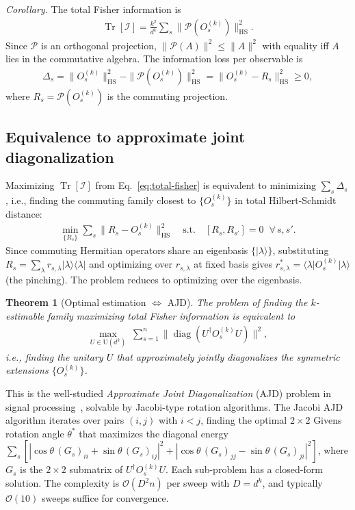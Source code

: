 \documentclass[aps,%
twocolumn,%
floatfix,%
pra,%
amsfonts,%
groupedaddress,%
superscriptaddress]{revtex4-2}%
\newtheorem{theorem}{Theorem}
\DeclareMathOperator{\tr}{Tr}
\DeclareMathOperator{\diag}{diag}
\newcommand{\bra}[1]{\langle #1\rvert}
\newcommand{\ket}[1]{\lvert #1\rangle}
\newcommand{\proj}[1]{\lvert #1\rangle\!\langle #1\rvert}
\newcommand{\1}{\mathbbm{1}}
\newcommand*{\cP}{\mathcal{P}}
\newcommand*{\cI}{\mathcal{I}}
\begin{document}
\emph{Corollary.} The total Fisher information is
\begin{align}\label{eq:total-fisher}
\tr[\cI] = \frac{k^2}{d^k}\sum_s \|\cP(O_s^{(k)})\|_{\mathrm{HS}}^2.
\end{align}
Since $\cP$ is an orthogonal projection, $\|\cP(A)\|^2 \leq \|A\|^2$ with equality iff $A$ lies in the commutative algebra. The information loss per observable is
\begin{align}\label{eq:info-loss}
\Delta_s = \|O_s^{(k)}\|_{\mathrm{HS}}^2 - \|\cP(O_s^{(k)})\|_{\mathrm{HS}}^2 = \|O_s^{(k)} - R_s\|_{\mathrm{HS}}^2 \geq 0,
\end{align}
where $R_s = \cP(O_s^{(k)})$ is the commuting projection.


\subsection{Equivalence to approximate joint diagonalization}\label{app:ajd}

Maximizing $\tr[\cI]$ from Eq.~\eqref{eq:total-fisher} is equivalent to minimizing $\sum_s \Delta_s$, i.e., finding the commuting family closest to $\{O_s^{(k)}\}$ in total Hilbert-Schmidt distance:
\begin{align}\label{eq:min-distance}
\min_{\{R_s\}} \sum_s \|R_s - O_s^{(k)}\|_{\mathrm{HS}}^2 \quad\text{s.t.}\quad [R_s, R_{s'}] = 0\;\;\forall\,s,s'.
\end{align}
Since commuting Hermitian operators share an eigenbasis $\{|\lambda\rangle\}$, substituting $R_s = \sum_\lambda r_{s,\lambda}\proj{\lambda}$ and optimizing over $r_{s,\lambda}$ at fixed basis gives $r_{s,\lambda}^* = \bra{\lambda}O_s^{(k)}\ket{\lambda}$ (the pinching). The problem reduces to optimizing over the eigenbasis.

\begin{theorem}[Optimal estimation $\Leftrightarrow$ AJD]\label{thm:ajd}
The problem of finding the $k$-estimable family maximizing total Fisher information is equivalent to
\begin{align}\label{eq:ajd}
\max_{U \in \mathrm{U}(d^k)} \;\sum_{s=1}^n \|\diag(U^\dagger O_s^{(k)} U)\|^2,
\end{align}
i.e., finding the unitary $U$ that \emph{approximately jointly diagonalizes} the symmetric extensions $\{O_s^{(k)}\}$.
\end{theorem}

This is the well-studied \emph{Approximate Joint Diagonalization} (AJD) problem in signal processing~\cite{cardoso1996joint}, solvable by Jacobi-type rotation algorithms. The Jacobi AJD algorithm iterates over pairs $(i,j)$ with $i < j$, finding the optimal $2\times 2$ Givens rotation angle $\theta^*$ that maximizes the diagonal energy $\sum_s [|\cos\theta\,(G_s)_{ii} + \sin\theta\,(G_s)_{ij}|^2 + |\cos\theta\,(G_s)_{jj} - \sin\theta\,(G_s)_{ji}|^2]$, where $G_s$ is the $2\times 2$ submatrix of $U^\dagger O_s^{(k)} U$. Each sub-problem has a closed-form solution. The complexity is $\mathcal{O}(D^2 n)$ per sweep with $D = d^k$, and typically $\mathcal{O}(10)$ sweeps suffice for convergence.
\end{document}
